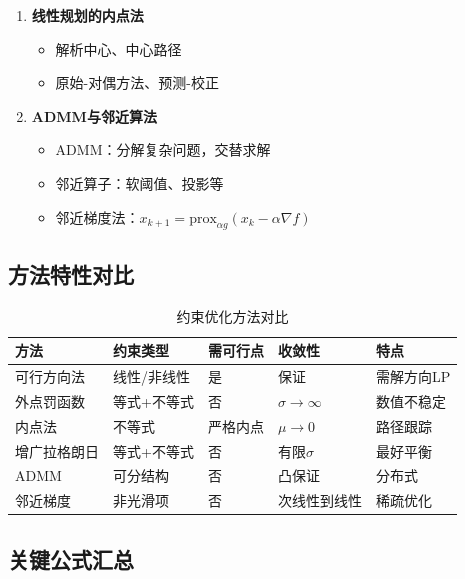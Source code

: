 \begin{conceptbox}
\begin{enumerate}[label=\arabic*., leftmargin=2em]
\begin{itemize}
    \end{itemize}
    \item \textbf{线性规划的内点法}
    \begin{itemize}
        \item 解析中心、中心路径
        \item 原始-对偶方法、预测-校正
    \end{itemize}
    \item \textbf{ADMM与邻近算法}
    \begin{itemize}
        \item ADMM：分解复杂问题，交替求解
        \item 邻近算子：软阈值、投影等
        \item 邻近梯度法：$x_{k+1} = \text{prox}_{\alpha g}(x_k - \alpha \nabla f)$
    \end{itemize}
\end{enumerate}
\end{conceptbox}

\subsection{方法特性对比}

\begin{table}[htbp]
\centering
\caption{约束优化方法对比}
\begin{tabular}{@{}lllll@{}}
\toprule
\textbf{方法} & \textbf{约束类型} & \textbf{需可行点} & \textbf{收敛性} & \textbf{特点} \\
\midrule
可行方向法 & 线性/非线性 & 是 & 保证 & 需解方向LP \\
外点罚函数 & 等式+不等式 & 否 & $\sigma\to\infty$ & 数值不稳定 \\
内点法 & 不等式 & 严格内点 & $\mu\to 0$ & 路径跟踪 \\
增广拉格朗日 & 等式+不等式 & 否 & 有限$\sigma$ & 最好平衡 \\
ADMM & 可分结构 & 否 & 凸保证 & 分布式 \\
邻近梯度 & 非光滑项 & 否 & 次线性到线性 & 稀疏优化 \\
\bottomrule
\end{tabular}
\end{table}

\subsection{关键公式汇总}

